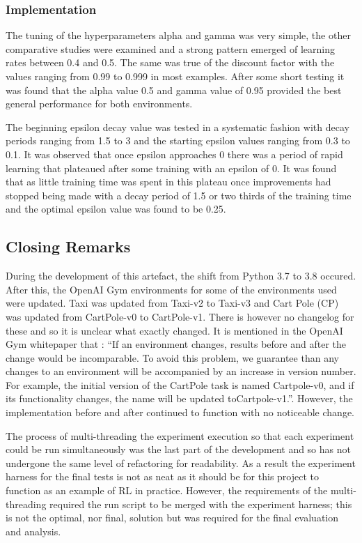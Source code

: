 \documentclass[hidelinks,journal]{IEEEtran}
\begin{document}
\subsubsection{Implementation}
\label{subsubsec:desAgentTuningImp}
The tuning of the hyperparameters alpha and gamma was very simple, the other comparative studies were examined and a strong pattern emerged of learning rates between 0.4 and 0.5. The same was true of the discount factor with the values ranging from 0.99 to 0.999 in most examples. After some short testing it was found that the alpha value 0.5 and gamma value of 0.95 provided the best general performance for both environments.

The beginning epsilon decay value was tested in a systematic fashion with decay periods ranging from 1.5 to 3 and the starting epsilon values ranging from 0.3 to 0.1. It was observed that once epsilon approaches 0 there was a period of rapid learning that plateaued after some training with an epsilon of 0. It was found that as little training time was spent in this plateau once improvements had stopped being made with a decay period of 1.5 or two thirds of the training time and the optimal epsilon value was found to be 0.25.
\subsection{Closing Remarks}
\label{subsec:desRem}
During the development of this artefact, the shift from Python 3.7 to 3.8 occured. After this, the OpenAI Gym environments for some of the environments used were updated. Taxi was updated from Taxi-v2 to Taxi-v3 and Cart Pole (CP) was updated from CartPole-v0 to CartPole-v1. There is however no changelog for these and so it is unclear what exactly changed. It is mentioned in the OpenAI Gym whitepaper \textcite{Brockman16} that : “If an environment changes, results before and after the change would be incomparable. To avoid this problem, we guarantee than any changes to an environment will be accompanied by an increase in version number. For example, the initial version of the CartPole task is named Cartpole-v0, and if its functionality changes, the name will be updated toCartpole-v1.”. However, the implementation before and after continued to function with no noticeable change.

The process of multi-threading the experiment execution so that each experiment could be run simultaneously was the last part of the development and so has not undergone the same level of refactoring for readability. As a result the experiment harness for the final tests is not as neat as it should be for this project to function as an example of RL in practice. However, the requirements of the multi-threading required the run script to be merged with the experiment harness; this is not the optimal, nor final, solution but was required for the final evaluation and analysis.
\end{document}
